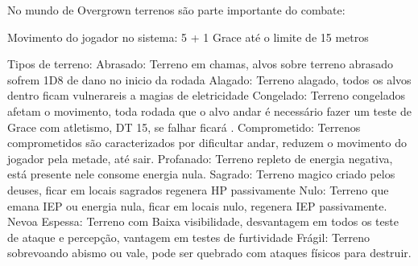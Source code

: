 
No mundo de Overgrown terrenos são parte importante do combate:

Movimento do jogador no sistema:
5 + 1 Grace até o limite de 15 metros

Tipos de terreno:
Abrasado: Terreno em chamas, alvos sobre terreno abrasado sofrem 1D8 de dano no inicio da rodada
Alagado: Terreno alagado, todos os alvos dentro ficam vulnerareis a magias de eletricidade
Congelado: Terreno congelados afetam o movimento, toda rodada que o alvo andar é necessário fazer um teste de Grace com atletismo, DT 15, se falhar ficará .
Comprometido: Terrenos comprometidos são caracterizados por dificultar andar, reduzem o movimento do jogador pela metade, até sair.
Profanado: Terreno repleto de energia negativa, está presente nele consome energia nula.
Sagrado: Terreno magico criado pelos deuses, ficar em locais sagrados regenera HP passivamente
Nulo: Terreno que emana IEP ou energia nula, ficar em locais nulo, regenera IEP passivamente.
Nevoa Espessa: Terreno com Baixa visibilidade, desvantagem em todos os teste de ataque e percepção, vantagem em testes de furtividade
Frágil: Terreno sobrevoando abismo ou vale, pode ser quebrado com ataques físicos para destruir.